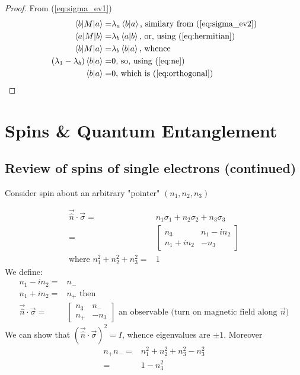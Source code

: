 \documentclass[]{article}
\begin{document}
\begin{proof}
	From (\ref{eq:sigma_ev1})
	\begin{align*}
		\braket{b \vert M \vert a} =& \lambda_a \braket{b\vert a} \text{, similary from (\ref{eq:sigma_ev2})}\\
		\braket{a \vert M \vert b} =& \lambda_b \braket{a\vert b} \text{, or, using (\ref{eq:hermitian})}\\
		\braket{b \vert M \vert a} =& \lambda_b \braket{b\vert a} \text{, whence}\\
		(\lambda_1-\lambda_b)\braket{b\vert a} =& 0 \text{, so, using (\ref{eq:ne})}\\
		\braket{b\vert a} =& 0\text{, which is (\ref{eq:orthogonal})}
	\end{align*}
\end{proof}
\section{Spins \& Quantum Entanglement}

\subsection{Review of spins of single electrons (continued)}

Consider spin about an arbitrary "pointer" $(n_1,n_2,n_3)$

\begin{align*}
	\vec{\hat{n}}\cdot\vec{\sigma} =& n_1\sigma_1 + n_2\sigma_2 + n_3 \sigma_3\\
	=& \begin{bmatrix}
		n_3&n_1-i n_2\\
		n_1 + i n_2&-n_3
	\end{bmatrix}\\
\text{where }n_1^2 + n_2^2 +n_3^2 =& 1		
\end{align*}
We define:
\begin{align*}
	n_1-i n_2 =& n_-\\
	n_1+i n_2 =& n_+\text{ then}\\
	\vec{\hat{n}}\cdot\vec{\sigma} =&\begin{bmatrix}
		n_3&n_-\\
		n_+&-n_3 
	\end{bmatrix}\text{ an observable (turn on magnetic field along $\vec{n}$)}
\end{align*}
We can show that $(\vec{\hat{n}}\cdot\vec{\sigma})^2=I$, whence eigenvalues are $\pm 1$. Moreover
\begin{align*}
	n_+ n_- =& n_1^2 + n_2^2 + n_3^2 -n_3^2\\
	=& 1 - n_3^2
\end{align*}
\end{document}
